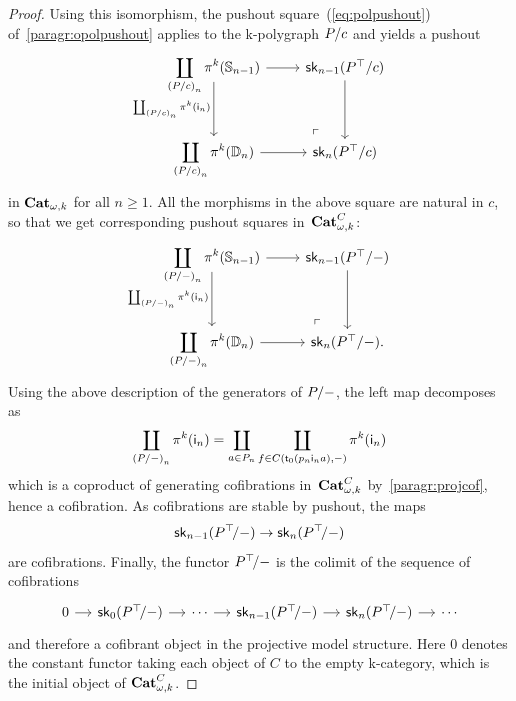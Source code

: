 \begin{proof}
   Using this isomorphism, the pushout square~(\ref{eq:polpushout})
   of~\ref{paragr:opolpushout} applies to the \ook k-polygraph $P/c$ and yields a pushout
  \[
    \begin{tikzcd}[row sep=large]
           \displaystyle\coprod_{{(\tr Pc)}_{n}} \opifun k (\Sph{n-1})
     \ar[d,"\coprod_{{(\tr Pc)}_{n}}\opifun
     k(\gcof{n})"',start anchor={[yshift=2.8ex]}]\ar[r]&\skl{n-1}(\tr{\frgp{P}}{c})\ar[d]\\
           \displaystyle\coprod_{{(\tr Pc)}_{n}}\opifun k(\Dsk{n})\ar[r]& \skl n{(\tr{\frgp{P}}{c})}
           \ar[from=1-1,to=2-2,phantom,"\ulcorner",very near end]
         \end{tikzcd}
  \]
  in $\mathbf{Cat}_{\omega,k}$ for all $n\geq 1$. All the morphisms in the above
  square are natural in $c$, so that we get corresponding pushout
  squares in~$\mathbf{Cat}_{\omega,k}^{C}$:
    \[
    \begin{tikzcd}[row sep=large]
           \displaystyle\coprod_{{(\tr P-)}_{n}} \opifun k (\Sph{n-1})
     \ar[d,"\coprod_{{(\tr P-)}_{n}}\opifun
     k(\gcof{n})"',start anchor={[yshift=2.8ex]}]\ar[r]&\skl{n-1}(\tr{\frgp{P}}{-})\ar[d]\\
           \displaystyle\coprod_{{(\tr P-)}_{n}}\opifun k(\Dsk{n})\ar[r]& \skl n{(\tr{\frgp{P}}{-})}.
           \ar[from=1-1,to=2-2,phantom,"\ulcorner",very near end]
         \end{tikzcd}
  \]
      Using the above description of the generators of $P/-$, the left
  map decomposes as
  \[
    \coprod_{{(P/-)}_{n}}\mathsf{\pi}_{}^{k}(\mathsf{i}_{n})=\coprod_{a\in
      P_n}\coprod_{f\in C(\mathsf{t}_{0}(p_n\mathsf{i}_{n}a),-)}\mathsf{\pi}_{}^{k}(\mathsf{i}_{n})
  \]
  which is a coproduct of generating cofibrations
  in~$\mathbf{Cat}_{\omega,k}^{C}$ by~\ref{paragr:projcof}, hence a cofibration. As cofibrations are
  stable by pushout, the maps
  \[
    \mathsf{sk}_{n-1}(P^\top\!/-)\to \mathsf{sk}_{n}(P^\top\!/-)
\]
   are cofibrations. Finally, the functor
  $P^\top\!/-$ is the colimit of the sequence of cofibrations
  \[
    \begin{tikzcd}[column sep=small]
      0\ar[r] &\skl 0(\tr{\frgp{P}\!}{-})\ar[r] &\cdots\ar[r]
      &\skl{n-1}(\tr{\frgp{P}\!}{-})\ar[r]&
      \skl n(\tr{\frgp{P}\!}{-})\ar[r] &\cdots
    \end{tikzcd}
  \]
  and therefore a cofibrant object in the projective model
  structure. Here $0$ denotes the constant functor taking each object
  of $C$ to the empty \ook k-category, which is the initial object of
  $\mathbf{Cat}_{\omega,k}^{C}$.
\end{proof}
